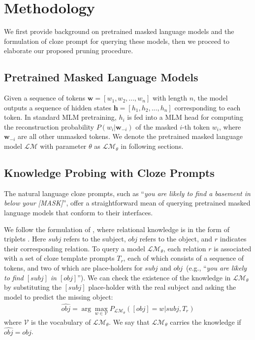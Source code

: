 \section{Methodology}
We first provide background on pretrained masked language models and the formulation of cloze prompt for querying these models, then we proceed to 
elaborate our proposed pruning procedure.
\subsection{Pretrained Masked Language Models}
\label{sec:PLMs}
Given a sequence of tokens $\bm{w}=[w_1, w_2, ..., w_n]$ with length $n$, the model outputs a sequence of hidden states $\bm{h}=[h_1, h_2, ..., h_n]$ corresponding to each token. In standard MLM pretraining, $h_{i}$ is fed into a  MLM head for computing the reconstruction probability $P(w_{i}|\bm{w}_{-i})$ of the masked $i$-th token $w_{i}$, where 
$\bm{w}_{-i}$ are all other unmasked tokens. We denote the pretrained masked language model 
$\mathcal{LM}$ with parameter $\theta$ as $\mathcal{LM}_{\theta}$ in following sections.
\subsection{Knowledge Probing with Cloze Prompts}
The natural language cloze prompts, such as ``\textit{you are likely to find a basement in below your [MASK]}'', offer a straightforward mean
of querying pretrained masked language models that conform to their interfaces.

We follow the formulation of \citet{Petroni2020}, where relational knowledge is in the form of triplets . 
Here $subj$ refers to the subject, $obj$ refers to the object, 
and $r$ indicates their corresponding relation. To query a model 
$\mathcal{LM}_{\theta}$, each relation $r$ is associated with a set of 
cloze template prompts $T_r$, each of which consists of a sequence of 
tokens, and two of which are place-holders for $subj$ and $obj$~(e.g., ``\textit{you are likely to find $[subj]$ in $[obj]$}''). We can
check the existence of the knowledge in $\mathcal{LM}_\theta$ by 
substituting the $[subj]$ place-holder with the 
real subject and asking the model to predict the missing object:
\begin{align}\nonumber
\hat{obj}=\arg \max_{w\in \mathcal{V}}P_{\mathcal{LM}_\theta}([obj]=w|subj, T_r)
\end{align}
where $\mathcal{V}$ is the vocabulary of $\mathcal{LM}_\theta$. We say that $\mathcal{LM}_\theta$ 
carries the knowledge if $\hat{obj}=obj$.

